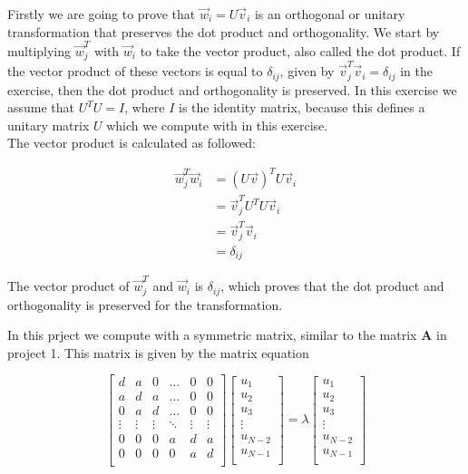 \documentclass{article}
\begin{document}
\begin{multicols}{2}
Firstly we are going to prove that $\vec{w}_i = U \vec{v}_i$ is an orthogonal or unitary transformation that preserves the dot product and orthogonality. We start by multiplying $\vec{w}_j ^T$ with $\vec{w}_i$ to take the vector product, also called the dot product. If the vector product of these vectors is equal to $\delta_{ij}$, given by $\vec{v}_j ^T \vec{v}_i = \delta_{ij}$ in the exercise, then the dot product and orthogonality is preserved. In this exercise we assume that $U^T U = I$, where $I$ is the identity matrix, because this defines a unitary matrix $U$ which we compute with in this exercise. \\

The vector product is calculated as followed:

\begin{align*}
  \vec{w}_j ^T \vec{w}_i &= (U \vec{v})^T U \vec{v}_i \\
  &= \vec{v}_j ^T U^T U \vec{v}_i \\
  &= \vec{v}_j ^T \vec{v}_i \\
  &= \delta _{ij}
\end{align*}

The vector product of $\vec{w}_j ^T$ and $\vec{w}_i$ is $\delta_{ij}$, which proves that the dot product and orthogonality is preserved for the transformation.

In this prject we compute with a symmetric matrix, similar to the matrix \textbf{A} in project 1. This matrix is given by the matrix equation

  \begin{equation*} \label{eq:fullmatrixeq}
    \begin{bmatrix}
        d & a & 0 & \dots & 0 & 0 \\
        a & d & a & \dots & 0 & 0 \\
        0 & a & d & \dots & 0 & 0 \\
        \vdots & \vdots & \vdots & \ddots & \vdots & \vdots \\
        0 & 0 & 0 & a & d & a \\
        0 & 0 & 0 & 0 & a & d \\
    \end{bmatrix}
    \begin{bmatrix}
        u_1 \\
        u_2 \\
        u_3 \\
        \vdots \\
        u_{N-2} \\
        u_{N-1} \\
    \end{bmatrix}
      = \lambda
    \begin{bmatrix}
        u_1 \\
        u_2 \\
        u_3 \\
        \vdots \\
        u_{N-2} \\
        u_{N-1} \\
    \end{bmatrix}
  \end{equation*} \\


\end{multicols}
\end{document}
